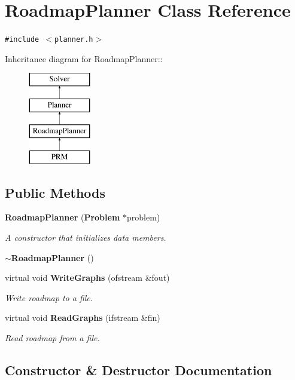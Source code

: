 \section{Roadmap\-Planner  Class Reference}
\label{classRoadmapPlanner}
{\tt \#include $<$planner.h$>$}

Inheritance diagram for Roadmap\-Planner::\begin{figure}[H]
\begin{center}
\leavevmode
\includegraphics[height=4cm]{classRoadmapPlanner}
\end{center}
\end{figure}
\subsection*{Public Methods}
\begin{CompactItemize}
\item 
{\bf Roadmap\-Planner} ({\bf Problem} $\ast$problem)
\begin{CompactList}\small\item\em A constructor that initializes data members.\item\end{CompactList}\item 
{\bf $\sim$Roadmap\-Planner} ()
\item 
virtual void {\bf Write\-Graphs} (ofstream \&fout)
\begin{CompactList}\small\item\em Write roadmap to a file.\item\end{CompactList}\item 
virtual void {\bf Read\-Graphs} (ifstream \&fin)
\begin{CompactList}\small\item\em Read roadmap from a file.\item\end{CompactList}\end{CompactItemize}


\subsection{Constructor \& Destructor Documentation}
